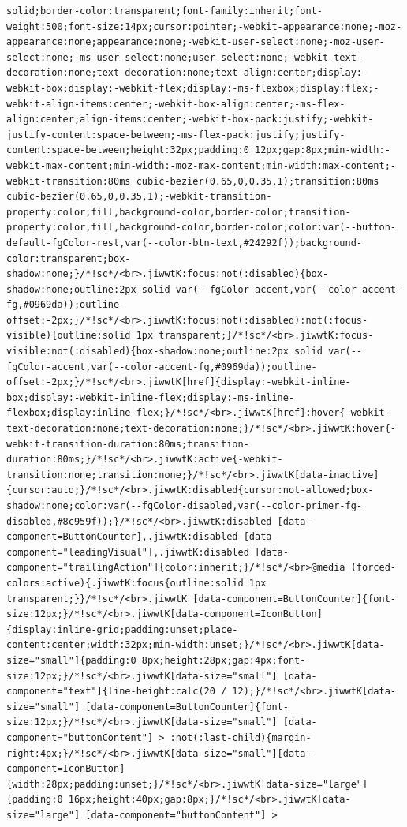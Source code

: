 \documentclass[
  letterpaper,
]{book}
\begin{document}
\begin{verbatim}
solid;border-color:transparent;font-family:inherit;font-weight:500;font-size:14px;cursor:pointer;-webkit-appearance:none;-moz-appearance:none;appearance:none;-webkit-user-select:none;-moz-user-select:none;-ms-user-select:none;user-select:none;-webkit-text-decoration:none;text-decoration:none;text-align:center;display:-webkit-box;display:-webkit-flex;display:-ms-flexbox;display:flex;-webkit-align-items:center;-webkit-box-align:center;-ms-flex-align:center;align-items:center;-webkit-box-pack:justify;-webkit-justify-content:space-between;-ms-flex-pack:justify;justify-content:space-between;height:32px;padding:0 12px;gap:8px;min-width:-webkit-max-content;min-width:-moz-max-content;min-width:max-content;-webkit-transition:80ms cubic-bezier(0.65,0,0.35,1);transition:80ms cubic-bezier(0.65,0,0.35,1);-webkit-transition-property:color,fill,background-color,border-color;transition-property:color,fill,background-color,border-color;color:var(--button-default-fgColor-rest,var(--color-btn-text,#24292f));background-color:transparent;box-shadow:none;}/*!sc*/<br>.jiwwtK:focus:not(:disabled){box-shadow:none;outline:2px solid var(--fgColor-accent,var(--color-accent-fg,#0969da));outline-offset:-2px;}/*!sc*/<br>.jiwwtK:focus:not(:disabled):not(:focus-visible){outline:solid 1px transparent;}/*!sc*/<br>.jiwwtK:focus-visible:not(:disabled){box-shadow:none;outline:2px solid var(--fgColor-accent,var(--color-accent-fg,#0969da));outline-offset:-2px;}/*!sc*/<br>.jiwwtK[href]{display:-webkit-inline-box;display:-webkit-inline-flex;display:-ms-inline-flexbox;display:inline-flex;}/*!sc*/<br>.jiwwtK[href]:hover{-webkit-text-decoration:none;text-decoration:none;}/*!sc*/<br>.jiwwtK:hover{-webkit-transition-duration:80ms;transition-duration:80ms;}/*!sc*/<br>.jiwwtK:active{-webkit-transition:none;transition:none;}/*!sc*/<br>.jiwwtK[data-inactive]{cursor:auto;}/*!sc*/<br>.jiwwtK:disabled{cursor:not-allowed;box-shadow:none;color:var(--fgColor-disabled,var(--color-primer-fg-disabled,#8c959f));}/*!sc*/<br>.jiwwtK:disabled [data-component=ButtonCounter],.jiwwtK:disabled [data-component="leadingVisual"],.jiwwtK:disabled [data-component="trailingAction"]{color:inherit;}/*!sc*/<br>@media (forced-colors:active){.jiwwtK:focus{outline:solid 1px transparent;}}/*!sc*/<br>.jiwwtK [data-component=ButtonCounter]{font-size:12px;}/*!sc*/<br>.jiwwtK[data-component=IconButton]{display:inline-grid;padding:unset;place-content:center;width:32px;min-width:unset;}/*!sc*/<br>.jiwwtK[data-size="small"]{padding:0 8px;height:28px;gap:4px;font-size:12px;}/*!sc*/<br>.jiwwtK[data-size="small"] [data-component="text"]{line-height:calc(20 / 12);}/*!sc*/<br>.jiwwtK[data-size="small"] [data-component=ButtonCounter]{font-size:12px;}/*!sc*/<br>.jiwwtK[data-size="small"] [data-component="buttonContent"] > :not(:last-child){margin-right:4px;}/*!sc*/<br>.jiwwtK[data-size="small"][data-component=IconButton]{width:28px;padding:unset;}/*!sc*/<br>.jiwwtK[data-size="large"]{padding:0 16px;height:40px;gap:8px;}/*!sc*/<br>.jiwwtK[data-size="large"] [data-component="buttonContent"] > 
\end{verbatim}
\end{document}
